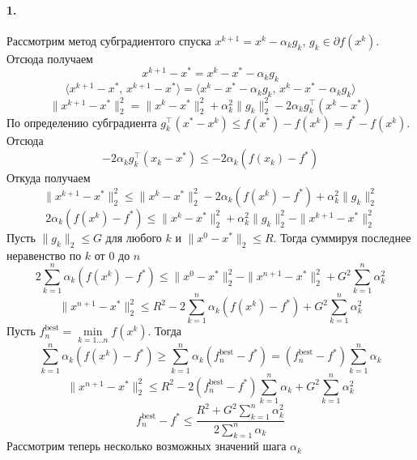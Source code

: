 \documentclass{article}
\begin{document}
\paragraph{1.} Рассмотрим метод субградиентого спуска $x^{k + 1} = x^k - \alpha_k g_k,\, g_k \in \partial f(x^k)$. Отсюда получаем
\[ x^{k + 1} - x^\ast = x^k - x^\ast - \alpha_k g_k \]
\[ \langle x^{k + 1} - x^\ast,\, x^{k + 1} - x^\ast \rangle = \langle x^k - x^\ast - \alpha_k g_k,\, x^k - x^\ast - \alpha_k g_k \rangle \]
\[ \| x^{k + 1} - x^\ast \|_2^2 = \| x^k - x^\ast \|_2^2 + \alpha_k^2 \|g_k\|_2^2 - 2 \alpha_k g_k^\top (x^k - x^\ast) \]
По определению субградиента $g_k^\top (x^\ast - x^k) \leqslant f(x^\ast) - f(x^k) = f^\ast - f(x^k)$. Отсюда
\[ -2\alpha_k g_k^\top (x_k - x^\ast) \leqslant -2\alpha_k \left( f(x_k) - f^\ast \right) \]
Откуда получаем
\[ \| x^{k + 1} - x^\ast \|_2^2 \leqslant \| x^k - x^\ast \|_2^2 - 2\alpha_k \left( f(x^k) - f^\ast \right) + \alpha_k^2 \| g_k \|_2^2 \]
\[ 2\alpha_k \left( f(x^k) - f^\ast \right) \leqslant \| x^k - x^\ast \|_2^2 + \alpha_k^2 \| g_k \|_2^2 - \| x^{k + 1} - x^\ast \|_2^2 \]
Пусть $\|g_k\|_2 \leqslant G$ для любого $k$ и $\| x^0 - x^\ast \|_2 \leqslant R$. Тогда суммируя последнее неравенство по $k$ от 0 до $n$
\[ 2 \sum_{k = 1}^n \alpha_k \left( f(x^k) - f^\ast \right) \leqslant \| x^0 - x^\ast \|_2^2 - \|x^{n + 1} - x^\ast \|_2^2 + G^2 \sum_{k = 1}^n \alpha_k^2 \]
\[ \|x^{n + 1} - x^\ast \|_2^2 \leqslant R^2 - 2 \sum_{k = 1}^n \alpha_k \left( f(x^k) - f^\ast \right) + G^2 \sum_{k = 1}^n \alpha_k^2 \]
Пусть $f_n^\text{best} = \min\limits_{k = 1\dotsc n} f(x^k)$. Тогда
\[ \sum_{k = 1}^n \alpha_k \left( f(x^k) - f^\ast \right) \geqslant \sum_{k = 1}^n \alpha_k \left( f_n^\text{best} -f^\ast \right) = \left( f_n^\text{best} -f^\ast \right) \sum_{k = 1}^n \alpha_k \]
\[ \|x^{n + 1} - x^\ast \|_2^2 \leqslant R^2 - 2 \left( f_n^\text{best} - f^\ast \right) \sum_{k = 1}^n \alpha_k + G^2 \sum_{k = 1}^n \alpha_k^2 \]
\[ f_n^\text{best} - f^\ast \leqslant \frac{R^2 + G^2 \sum\limits_{k = 1}^n \alpha_k^2}{ 2 \sum\limits_{k = 1}^n \alpha_k } \]
Рассмотрим теперь несколько возможных значений шага $\alpha_k$
\end{document}
